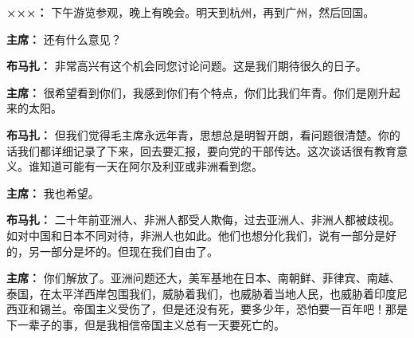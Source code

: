 \begin{list}{}
\item[\textbf{×××：}] 下午游览参观，晚上有晚会。明天到杭州，再到广州，然后回国。

\item[\textbf{主席：}] 还有什么意见？

\item[\textbf{布马扎：}] 非常高兴有这个机会同您讨论问题。这是我们期待很久的日子。

\item[\textbf{主席：}] 很希望看到你们，我感到你们有个特点，你们比我们年青。你们是刚升起来的太阳。

\item[\textbf{布马扎：}] 但我们觉得毛主席永远年青，思想总是明智开朗，看问题很清楚。你的话我们都详细记录了下来，回去要汇报，要向党的干部传达。这次谈话很有教育意义。谁知道可能有一天在阿尔及利亚或非洲看到您。

\item[\textbf{主席：}] 我也希望。

\item[\textbf{布马扎：}] 二十年前亚洲人、非洲人都受人欺侮，过去亚洲人、非洲人都被歧视。如对中国和日本不同对待，非洲人也如此。他们也想分化我们，说有一部分是好的，另一部分是坏的。但现在我们自由了。

\item[\textbf{主席：}] 你们解放了。亚洲问题还大，美军基地在日本、南朝鲜、菲律宾、南越、泰国，在太平洋西岸包围我们，威胁着我们，也威胁着当地人民，也威胁着印度尼西亚和锡兰。帝国主义受伤了，但是还没有死，要多少年，恐怕要一百年吧！那是下一辈子的事，但是我相信帝国主义总有一天要死亡的。
\end{list}
